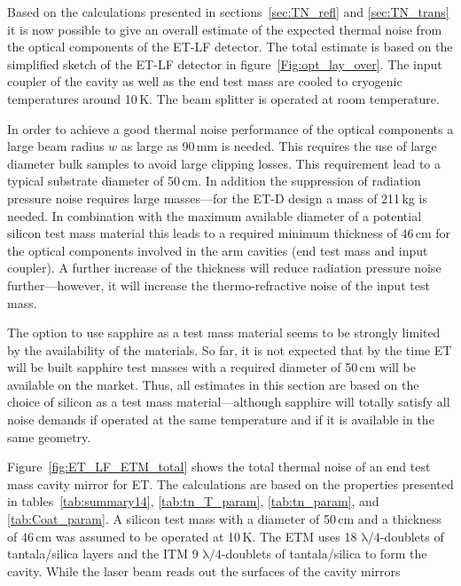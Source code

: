 
Based on the calculations presented in sections~\ref{sec:TN_refl} and \ref{sec:TN_trans} it is now possible to give an overall estimate of the expected thermal noise from the optical components of the ET-LF detector. The total estimate is based on the simplified sketch of the ET-LF detector in figure~\ref{Fig:opt_lay_over}. The input coupler of the cavity as well as the end test mass are cooled to cryogenic temperatures around 10\,K. The beam splitter is operated at room temperature. 

In order to achieve a good thermal noise performance of the optical components a large beam radius $w$ as large as 90\,mm is needed. This requires the use of large diameter bulk samples to avoid large clipping losses. This requirement lead to a typical substrate diameter of 50\,cm. In addition the suppression of radiation pressure noise requires large masses---for the ET-D design a mass of 211\,kg is needed. In combination with the maximum available diameter of a potential silicon test mass material this leads to a required minimum thickness of 46\,cm for the optical components involved in the arm cavities (end test mass and input coupler). A further increase of the thickness will reduce radiation pressure noise further---however, it will increase the thermo-refractive noise of the input test mass. 

The option to use sapphire as a test mass material seems to be strongly limited by the availability of the materials. So far, it is not expected that by the time ET will be built sapphire test masses with a required diameter of 50\,cm will be available on the market. Thus, all estimates in this section are based on the choice of silicon as a test mass material---although sapphire will totally satisfy all noise demands if operated at the same temperature and if it is available in the same geometry.

Figure~\ref{fig:ET_LF_ETM_total} shows the total thermal noise of an end test mass cavity mirror for ET. The calculations are based on the properties presented in tables~\ref{tab:summary14}, \ref{tab:tn_T_param}, \ref{tab:tn_param}, and \ref{tab:Coat_param}. A silicon test mass with a diameter of 50\,cm and a thickness of 46\,cm was assumed to be operated at 10\,K. The ETM uses 18 $\mathrm{\lambda/4}$-doublets of tantala/silica layers and the ITM 9 $\mathrm{\lambda/4}$-doublets of tantala/silica to form the cavity. While the laser beam reads out the surfaces of the cavity mirrors 

